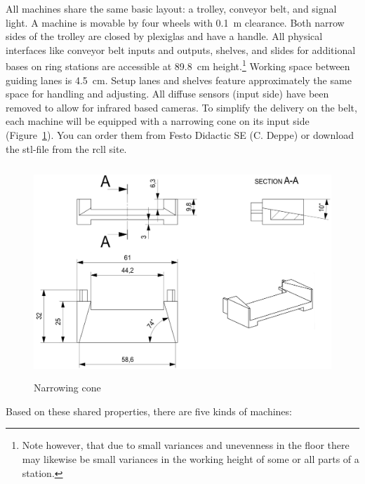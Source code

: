 \documentclass[12pt,twoside]{article}
\newcommand{\reffig}[1]{Figure~\ref{#1}}
\begin{document}
All machines share the same basic layout: a trolley, conveyor belt,
and signal light. A machine is movable by four wheels with
\SI{0.1}{\metre} clearance. Both narrow sides of the trolley are
closed by plexiglas and have a handle. All physical interfaces like
conveyor belt inputs and outputs, shelves, and slides for additional
bases on ring stations are accessible at \SI{89.8}{\centi\metre}
height.\footnote{Note however, that due to small variances and
  unevenness in the floor there may likewise be small variances in the
  working height of some or all parts of a station.} Working space
between guiding lanes is \SI{4.5}{\centi\metre}. Setup lanes and
shelves feature approximately the same space for handling and
adjusting. All diffuse sensors (input side) have been removed to allow for infrared based cameras.
To simplify the delivery on the belt, each machine will be
equipped with a narrowing cone on its input side (\reffig{fig:narrow-cone}).
You can order them from Festo Didactic SE 
(C. Deppe) or download the stl-file from the rcll site.
\begin{figure}
    \includegraphics[height=8cm]{narrowConeSketch.jpg}
\caption{Narrowing cone}
\label{fig:narrow-cone}
\end{figure}

%    


Based on these shared properties, there are five kinds of machines:
\end{document}
